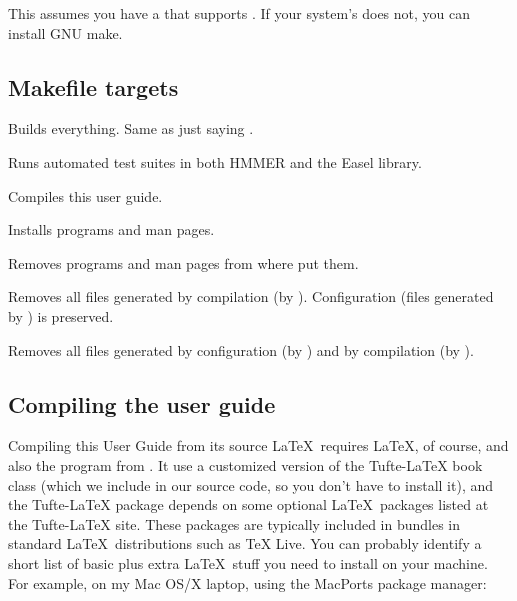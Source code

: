 This assumes you have a  that supports . If your
system's  does not, you can install GNU make.


\subsection{Makefile targets}

\begin{sreitems}{}

\item[\monob{all}]
  Builds everything. Same as just saying .

\item[\monob{check}]
  Runs automated test suites in both HMMER and the Easel library.

\item[\monob{pdf}]
  Compiles this user guide.

\item[\monob{install}]
  Installs programs and man pages.

\item[\monob{uninstall}]
  Removes programs and man pages from where  put them.

\item[\monob{clean}] Removes all files generated by compilation (by
  ). Configuration (files generated by )
  is preserved.

\item[\monob{distclean}]
  Removes all files generated by configuration (by )
  and by compilation (by ). 

\end{sreitems}


\subsection{Compiling the user guide}

Compiling this User Guide from its source \LaTeX\ requires \LaTeX, of
course, and also the  program from
.
It use a customized version of the
Tufte-LaTeX book class
(which we include in our source code, so you don't have to
install it), and the Tufte-LaTeX package depends on some optional \LaTeX\ packages
listed at the
Tufte-LaTeX site.
These packages are typically included in bundles in
standard \LaTeX\ distributions such as
TeX Live.
You can probably
identify a short list of basic plus extra \LaTeX\ stuff you need to install on your machine. For
example, on my Mac OS/X laptop, using the MacPorts
package manager:

